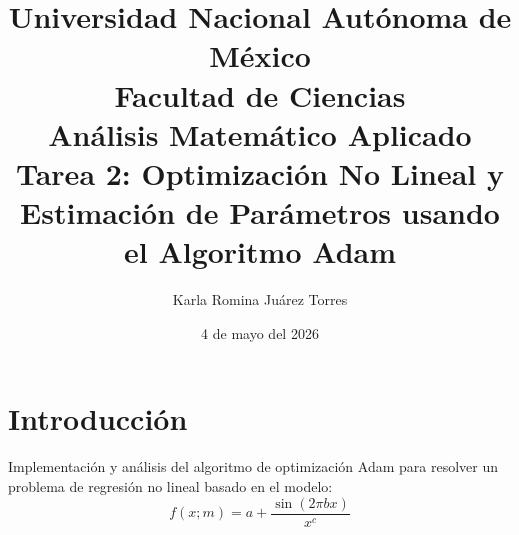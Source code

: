 \documentclass[12pt, mexican]{report}
\title{
    \textbf{Universidad Nacional Autónoma de México} \\
    \Large Facultad de Ciencias \\
    \vspace{1cm}
    \large Análisis Matemático Aplicado \\
    \vspace{0.5cm}
    \textbf{Tarea 2: Optimización No Lineal y Estimación de Parámetros usando el Algoritmo Adam}
}
\author{Karla Romina Juárez Torres}
\date{4 de mayo del 2026}
\begin{document}
\maketitle

\chapter{Introducción}
Implementación y análisis del algoritmo de optimización Adam para resolver un problema de regresión no lineal basado en el modelo:
\begin{equation}
    f(x;m)=a+\frac{\sin(2\pi bx)}{x^{c}}
\end{equation}





\end{document}
